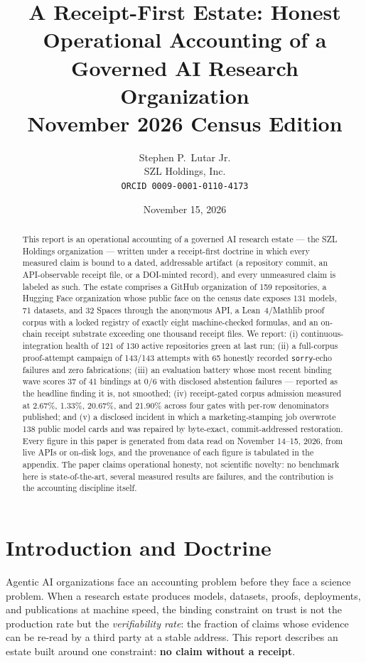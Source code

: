 \documentclass[11pt]{article}
\title{A Receipt-First Estate: Honest Operational Accounting of a Governed AI Research Organization\\ \large November 2026 Census Edition}
\author{Stephen P.\ Lutar Jr.\\ SZL Holdings, Inc.\\ \texttt{ORCID 0009-0001-0110-4173}}
\date{November 15, 2026}
\begin{document}
\maketitle

\begin{abstract}
This report is an operational accounting of a governed AI research estate --- the SZL Holdings organization --- written under a receipt-first doctrine in which every measured claim is bound to a dated, addressable artifact (a repository commit, an API-observable receipt file, or a DOI-minted record), and every unmeasured claim is labeled as such. The estate comprises a GitHub organization of 159 repositories, a Hugging Face organization whose public face on the census date exposes 131 models, 71 datasets, and 32 Spaces through the anonymous API, a Lean~4/Mathlib proof corpus with a locked registry of exactly eight machine-checked formulas, and an on-chain receipt substrate exceeding one thousand receipt files. We report: (i) continuous-integration health of 121 of 130 active repositories green at last run; (ii) a full-corpus proof-attempt campaign of 143/143 attempts with 65 honestly recorded \texttt{sorry}-echo failures and zero fabrications; (iii) an evaluation battery whose most recent binding wave scores 37 of 41 bindings at 0/6 with disclosed abstention failures --- reported as the headline finding it is, not smoothed; (iv) receipt-gated corpus admission measured at 2.67\%, 1.33\%, 20.67\%, and 21.90\% across four gates with per-row denominators published; and (v) a disclosed incident in which a marketing-stamping job overwrote 138 public model cards and was repaired by byte-exact, commit-addressed restoration. Every figure in this paper is generated from data read on November 14--15, 2026, from live APIs or on-disk logs, and the provenance of each figure is tabulated in the appendix. The paper claims operational honesty, not scientific novelty: no benchmark here is state-of-the-art, several measured results are failures, and the contribution is the accounting discipline itself.
\end{abstract}

\section{Introduction and Doctrine}
\label{sec:intro}

Agentic AI organizations face an accounting problem before they face a science problem. When a research estate produces models, datasets, proofs, deployments, and publications at machine speed, the binding constraint on trust is not the production rate but the \emph{verifiability rate}: the fraction of claims whose evidence can be re-read by a third party at a stable address. This report describes an estate built around one constraint: \textbf{no claim without a receipt}.
\end{document}
